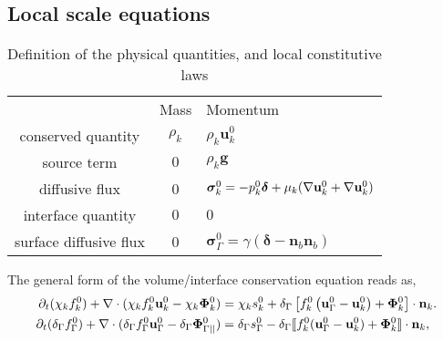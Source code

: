 \documentclass[12pt]{My_preprint}
\begin{document}
\subsection{Local scale equations}

\begin{table}[h!]  
    \centering
    \begin{tabular}{ccl}
     & Mass & Momentum \\
    conserved quantity & $\rho_k$ & $\rho_k \textbf{u}_k^0$ \\
    source term  & $0$ & $\rho_k \textbf{g}$ \\
    diffusive flux & 0 & $\bm\sigma_k^0 = -p_k^0 \bm\delta + \mu_k (\mathbf{\nabla} \textbf{u}_k^0 + \mathbf{\nabla} \textbf{u}_k^0)$ \\
    interface quantity & $0$ & $0$ \\
    surface diffusive flux & 0 & $\bm\sigma_\Gamma^0 = \gamma (\bm\delta - \textbf{n}_b\textbf{n}_b)$ \\
    \end{tabular}
    \caption{Definition of the physical quantities, and local constitutive laws}
    \label{tab:qte_Newtonian}
\end{table}
The general form of the volume/interface conservation equation reads as, 
\begin{align}
    \pddt (\chi_k f_k^0)
    + \div (
        \chi_k f_k^0 \textbf{u}_k^0
        - \chi_k \mathbf{\Phi}_k^0 
        )
    &= 
    \chi_k s_k^0
    + \delta_\Gamma \left[
        f_k^0
        \left(
            \textbf{u}_\Gamma^0
            - \textbf{u}_k^0
        \right)
        + \mathbf{\Phi}_k^0
    \right]
    \cdot \textbf{n}_k.
    \label{eq:dt_chi_k_f_k}\\
    \pddt (\delta_\Gamma f_\Gamma^0)  
    + \div (
        \delta_\Gamma  f_\Gamma^0 \textbf{u}_\Gamma^0
        - \delta_\Gamma  \mathbf{\Phi}_{\Gamma||}^0 
        )
    &= 
    \delta_\Gamma s_\Gamma^0
    - \delta_\Gamma \Jump{
    f_k^0 (\textbf{u}_\Gamma^0 - \textbf{u}_k^0)
    + \mathbf{\Phi}_k^0},
    \label{eq:dt_delta_I_f_I}
\end{align}
\end{document}
